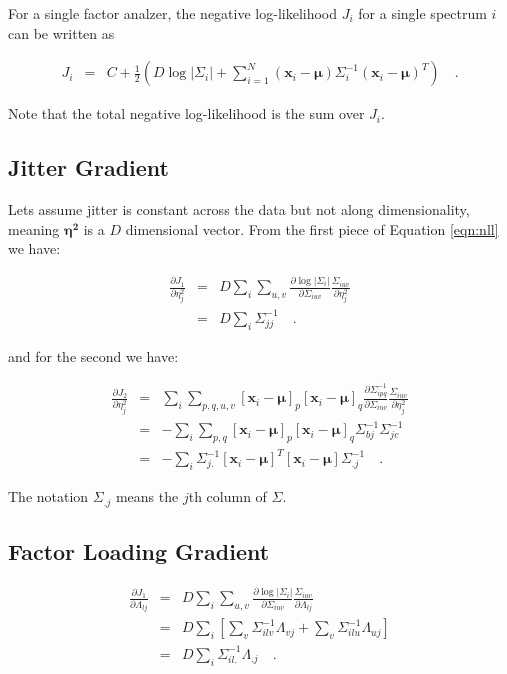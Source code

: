 \documentclass[letterpaper,12pt]{article}
\newcommand{\vect}[1]{\boldsymbol{#1}}
\newcommand{\data}{\vect{x}}
\newcommand{\mean}{\vect{\mu}}
\newcommand{\et}{\vect{\eta^2}}
\begin{document}
For a single factor analzer, the negative log-likelihood $J_i$ for a single spectrum $i$ can be
written as

\begin{eqnarray}\displaystyle
J_{i} &=& C + \frac{1}{2}\left(D\log|\Sigma_i| + \sum_{i=1}^N(\data_i-\mean)\Sigma_i^{-1}(\data_i-\mean)^T\right)
\quad .
\label{eqn:nll}
\end{eqnarray}

Note that the total negative log-likelihood is the sum over $J_i$.

\subsection{Jitter Gradient}

Lets assume jitter is constant across the data but not along
dimensionality, meaning $\et$ is a $D$ dimensional vector.  From the
first piece of Equation \ref{eqn:nll} we have:

\begin{eqnarray}\displaystyle
\frac{\partial J_1}{\partial \eta_j^2} &=& D\sum_i \sum_{u,v}
\frac{\partial \log|\Sigma_i|}{\partial
  \Sigma_{iuv}}\frac{\Sigma_{iuv}}{\partial \eta_j^2} \\
&=& D \sum_i \Sigma_{jj}^{-1}
\quad .
\label{eqn:gradjit1}
\end{eqnarray}

and for the second we have:

\begin{eqnarray}\displaystyle
\frac{\partial J_2}{\partial \eta_j^2} &=& \sum_i \sum_{p,q,u,v}
[\data_i-\mean]_p [\data_i-\mean]_q\frac{\partial \Sigma^{-1}_{ipq}}{\partial
  \Sigma_{iuv}}\frac{\Sigma_{iuv}}{\partial \eta_j^2} \\
&=& -\sum_i \sum_{p,q}[\data_i-\mean]_p [\data_i-\mean]_q\Sigma_{bj}^{-1}\Sigma_{jc}^{-1}\\
&=& -\sum_i \Sigma_{j.}^{-1}[\data_i-\mean]^T [\data_i-\mean]\Sigma_{.j}^{-1}
\quad .
\label{eqn:gradjit2}
\end{eqnarray}

The notation $\Sigma_{.j}$ means the $j$th column of $\Sigma$.

\subsection{Factor Loading Gradient}

\begin{eqnarray}\displaystyle
\frac{\partial J_1}{\partial \Lambda_{lj}} &=& D\sum_i \sum_{u,v}
\frac{\partial \log|\Sigma_i|}{\partial
  \Sigma_{iuv}}\frac{\Sigma_{iuv}}{\partial \Lambda_{lj}} \\
&=& D \sum_i \left[\sum_v\Sigma^{-1}_{ilv}\Lambda_{vj} + \sum_v\Sigma^{-1}_{ilu}\Lambda_{uj}\right]\\
&=& D \sum_i \Sigma^{-1}_{il.}\Lambda_{.j}
\quad .
\label{eqn:lambda1}
\end{eqnarray}
\end{document}
